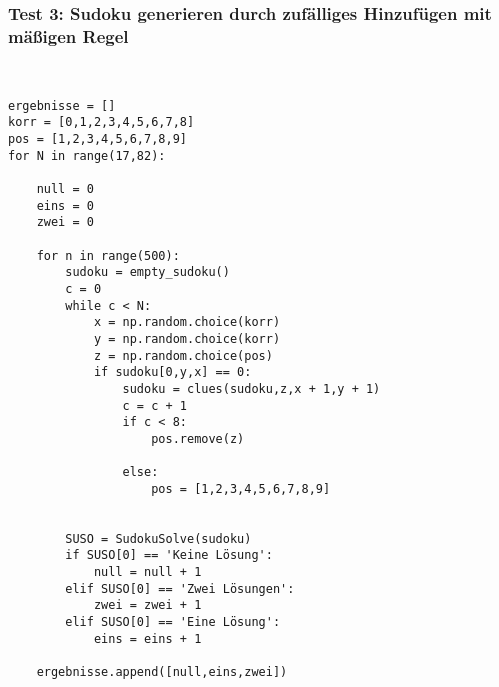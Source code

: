 \documentclass[11pt,a4paper]{article}
\begin{document}
\subsubsection{Test 3: Sudoku generieren durch zufälliges Hinzufügen mit mäßigen Regel}
\ \\
\begin{verbatim}
ergebnisse = []                          
korr = [0,1,2,3,4,5,6,7,8]               
pos = [1,2,3,4,5,6,7,8,9]                
for N in range(17,82):                   

    null = 0                             
    eins = 0                             
    zwei = 0                             
    
    for n in range(500):                 
        sudoku = empty_sudoku()          
        c = 0                            
        while c < N:                                  
            x = np.random.choice(korr)                
            y = np.random.choice(korr)                
            z = np.random.choice(pos)                 
            if sudoku[0,y,x] == 0:                    
                sudoku = clues(sudoku,z,x + 1,y + 1)  
                c = c + 1                             
                if c < 8:                             
                    pos.remove(z)                     
                
                else:                                 
                    pos = [1,2,3,4,5,6,7,8,9]         
                    
        
        SUSO = SudokuSolve(sudoku)         
        if SUSO[0] == 'Keine Lösung':      
            null = null + 1                
        elif SUSO[0] == 'Zwei Lösungen':  
            zwei = zwei + 1                                               
        elif SUSO[0] == 'Eine Lösung':     
            eins = eins + 1                
    
    ergebnisse.append([null,eins,zwei])    
\end{verbatim}
\ \\
\end{document}
